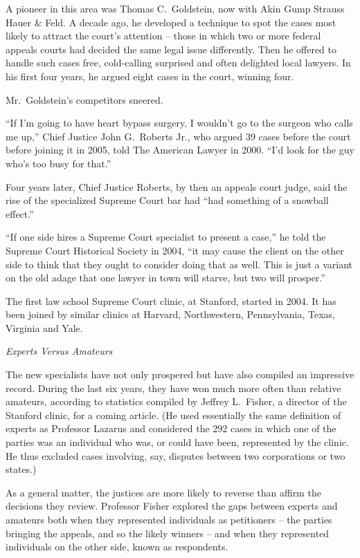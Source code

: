 ﻿\documentclass[12pt]{article}
\begin{document}
A pioneer in this area was Thomas C.~Goldstein, now with Akin Gump Strauss Hauer \& Feld. A decade
ago, he developed a technique to spot the cases most likely to attract the court's attention --
those in which two or more federal appeals courts had decided the same legal issue differently. Then
he offered to handle such cases free, cold-calling surprised and often delighted local lawyers. In
his first four years, he argued eight cases in the court, winning four.

Mr.~Goldstein's competitors sneered.

``If I'm going to have heart bypass surgery, I wouldn't go to the surgeon who calls me up,'' Chief
Justice John G.~Roberts Jr., who argued 39 cases before the court before joining it in 2005, told
The American Lawyer in 2000. ``I'd look for the guy who's too busy for that.''

Four years later, Chief Justice Roberts, by then an appeals court judge, said the rise of the
specialized Supreme Court bar had ``had something of a snowball effect.''

``If one side hires a Supreme Court specialist to present a case,'' he told the Supreme Court
Historical Society in 2004, ``it may cause the client on the other side to think that they ought to
consider doing that as well. This is just a variant on the old adage that one lawyer in town will
starve, but two will prosper.''

The first law school Supreme Court clinic, at Stanford, started in 2004. It has been joined by
similar clinics at Harvard, Northwestern, Pennsylvania, Texas, Virginia and Yale.

\emph{Experts Versus Amateurs}

The new specialists have not only prospered but have also compiled an impressive record. During the
last six years, they have won much more often than relative amateurs, according to statistics
compiled by Jeffrey L.~Fisher, a director of the Stanford clinic, for a coming article. (He used
essentially the same definition of experts as Professor Lazarus and considered the 292 cases in
which one of the parties was an individual who was, or could have been, represented by the clinic.
He thus excluded cases involving, say, disputes between two corporations or two states.)

As a general matter, the justices are more likely to reverse than affirm the decisions they review.
Professor Fisher explored the gaps between experts and amateurs both when they represented
individuals as petitioners -- the parties bringing the appeals, and so the likely winners -- and
when they represented individuals on the other side, known as respondents.
\end{document}
